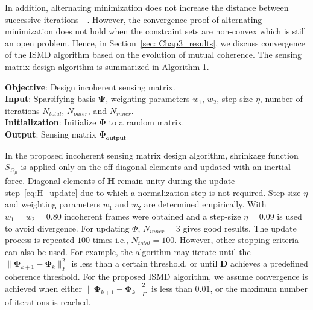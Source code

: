 In addition, alternating minimization does not increase the distance between successive iterations~\cite{Frame}~\cite{Lewis_convergence}. However, the convergence proof of alternating minimization does not hold when the constraint sets are non-convex which is still an open problem. Hence, in Section~\ref{sec: Chap3_results}, we discuss convergence of the ISMD algorithm based on the evolution of mutual coherence. The sensing matrix design algorithm is summarized in Algorithm 1.
%
\begin{algorithm}
\SetAlgoLined
\textbf{Objective}: Design incoherent sensing matrix.\\
\textbf{Input}: Sparsifying basis $\bm{\Psi}$, weighting parameters $w_{1}$, $w_{2}$, step size $\eta$, number of iterations $N_{total}$, $N_{outer}$, and $N_{inner}$.\\
 \textbf{Initialization}: Initialize $\bm{\Phi}$ to a random matrix.\\
 \textbf{Output}: Sensing matrix $\bm{\Phi_{output}}$
 \caption{Incoherent sensing matrix design (ISMD) using alternating minimization}
\end{algorithm}
%

In the proposed incoherent sensing matrix design algorithm, shrinkage function $S_{\Omega_{\mu}}$ is applied only on the off-diagonal elements and updated with an inertial force. Diagonal elements of $\bm{H}$ remain unity during the update step~\eqref{eq:H_update} due to which a normalization step is not required. Step size $\eta$ and weighting parameters $w_{1}$ and $w_{2}$ are determined empirically. With $w_{1}=w_{2}=0.80$ incoherent frames were obtained and a step-size $\eta = 0.09$ is used to avoid divergence. For updating $\Phi$, $N_{inner} = 3$ gives good results. The update process is repeated $100$ times i.e., $N_{total} = 100$. However, other stopping criteria can also be used. For example, the algorithm may iterate until the $\| \bm{\Phi}_{k+1} - \bm{\Phi}_{k} \|_{F}^{2}$ is less than a certain threshold, or until $\bm{D}$ achieves a predefined coherence threshold. For the proposed ISMD algorithm, we assume convergence is achieved when either $\| \bm{\Phi}_{k+1} - \bm{\Phi}_{k} \|_{F}^{2}$ is less than $0.01$, or the maximum number of iterations is reached. 
%
